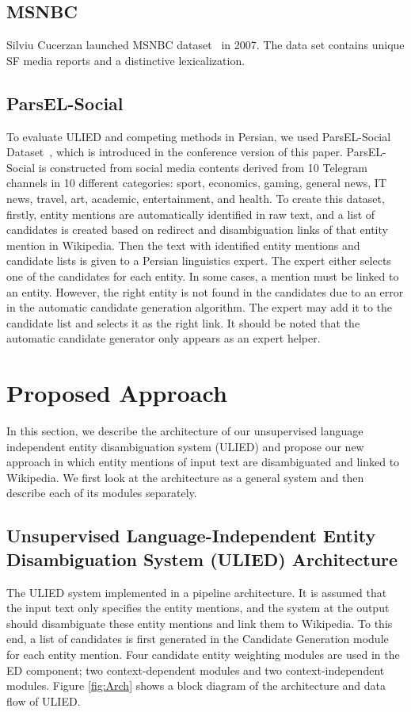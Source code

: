 \documentclass{article}
\begin{document}
\subsection{MSNBC}
Silviu Cucerzan launched MSNBC dataset~\cite{cucerzan2007large} in 2007. The data set contains unique SF media reports and a distinctive lexicalization.

\subsection{ParsEL-Social}
To evaluate ULIED and competing methods in Persian, we used ParsEL-Social Dataset~\cite{fakhrian2019parsel}, which is introduced in the conference version of this paper. ParsEL-Social is constructed from social media contents derived from 10 Telegram channels in 10 different categories: sport, economics, gaming, general news, IT news, travel, art, academic, entertainment, and health.
To create this dataset, firstly, entity mentions are automatically identified in raw text, and a list of candidates is created based on redirect and disambiguation links of that entity mention in Wikipedia. Then the text with identified entity mentions and candidate lists is given to a Persian linguistics expert. The expert either selects one of the candidates for each entity. In some cases, a mention must be linked to an entity. However, the right entity is not found in the candidates due to an error in the automatic candidate generation algorithm. The expert may add it to the candidate list and selects it as the right link. It should be noted that the automatic candidate generator only appears as an expert helper.


\section{Proposed Approach}
\label{sec:proposed-approach}
In this section, we describe the architecture of our unsupervised language independent entity disambiguation system (ULIED) and propose our new approach in which entity mentions of input text are disambiguated and linked to Wikipedia. We first look at the architecture as a general system and then describe each of its modules separately. 

\subsection{Unsupervised Language-Independent Entity Disambiguation System (ULIED) Architecture}
The ULIED system implemented in a pipeline architecture. It is assumed that the input text only specifies the entity mentions, and the system at the output should disambiguate these entity mentions and link them to Wikipedia. To this end, a list of candidates is first generated in the Candidate Generation module for each entity mention. Four candidate entity weighting modules are used in the ED component; two context-dependent modules and two context-independent modules. Figure \ref{fig:Arch} shows a block diagram of the architecture and data flow of ULIED. 
\end{document}

